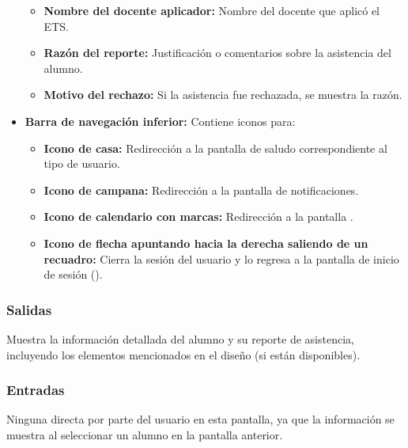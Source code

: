 \begin{itemize}
\begin{itemize}
		\item \textbf{Nombre del docente aplicador:} Nombre del docente que aplicó el ETS.
		\item \textbf{Razón del reporte:} Justificación o comentarios sobre la asistencia del alumno.
		\item \textbf{Motivo del rechazo:} Si la asistencia fue rechazada, se muestra la razón.
	\end{itemize}
	\item \textbf{Barra de navegación inferior:} Contiene iconos para:
	\begin{itemize}
		\item \textbf{Icono de casa:} Redirección a la pantalla de saludo correspondiente al tipo de usuario.
		\item \textbf{Icono de campana:} Redirección a la pantalla de notificaciones.
		\item \textbf{Icono de calendario con marcas:} Redirección a la pantalla .
		\item \textbf{Icono de flecha apuntando hacia la derecha saliendo de un recuadro:} Cierra la sesión del usuario y lo regresa a la pantalla de inicio de sesión ().
	\end{itemize}
\end{itemize}

\subsubsection{Salidas}
Muestra la información detallada del alumno y su reporte de asistencia, incluyendo los elementos mencionados en el diseño (si están disponibles).

\subsubsection{Entradas}
Ninguna directa por parte del usuario en esta pantalla, ya que la información se muestra al seleccionar un alumno en la pantalla anterior.

